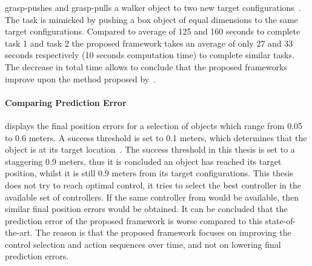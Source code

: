 \citeauthor{sabbaghnovin_model_2021} grasp-pushes and grasp-pulls a walker object to two new target configurations~\cite{sabbaghnovin_model_2021}. The task is mimicked by pushing a box object of equal dimensions to the same target configurations. Compared to \citeauthor{sabbaghnovin_model_2021} average of 125 and 160 seconds to complete task 1 and task 2 the proposed framework takes an average of only 27 and 33 seconds respectively (10 seconds computation time) to complete similar tasks. The decrease in total time allows to conclude that the proposed frameworks improve upon the method proposed by~\citeauthor{sabbaghnovin_model_2021}.\bs {}

\paragraph{Comparing Prediction Error}
\citeauthor{sabbaghnovin_model_2021} displays the final position errors for a selection of objects which range from 0.05 to 0.6 meters. A success threshold is set to 0.1 meters, which determines that the object is at its target location~\cite{sabbaghnovin_model_2021}. The success threshold in this thesis is set to a staggering 0.9 meters, thus it is concluded an object has reached its target position, whilst it is still 0.9 meters from its target configurations. This thesis does not try to reach optimal control, it tries to select the best controller in the available set of controllers. If the same controller from \citeauthor{sabbaghnovin_model_2021} would be available, then similar final position errors would be obtained. It can be concluded that the prediction error of the proposed framework is worse compared to this state-of-the-art. The reason is that the proposed framework focuses on improving the control selection and action sequences over time, and not on lowering final prediction errors.\bs

